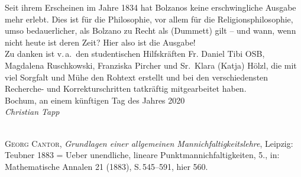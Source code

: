 \hbox{}\par\noindent{}%
\rule{0pt}{1.4\baselineskip}Seit ihrem Erscheinen im Jahre 1834 hat Bolzanos  keine erschwingliche Ausgabe mehr erlebt. Dies ist für die Philosophie, vor allem für die Religionsphilosophie, umso bedauerlicher, als Bolzano zu Recht als  (Dummett) gilt -- und wann, wenn nicht heute ist deren Zeit? Hier also ist die Ausgabe!\\[\baselineskip]
Zu danken ist v.\,a.\ den studentischen Hilfskräften Fr. Daniel Tibi OSB, Magdalena Ruschkowski, Franziska Pircher und Sr.~Klara (Katja) Hölzl, die mit viel Sorgfalt und Mühe den Rohtext erstellt und bei den verschiedensten Recherche- und Korrekturschritten tatkräftig mitgearbeitet haben.\\[\baselineskip]
Bochum, an einem künftigen Tag des Jahres 2020\\[\baselineskip]
\hbox{}\hfill\textit{Christian Tapp}

\RWch*{\hbox{}}\vspace{-0.35\baselineskip}
\\[0.5\baselineskip]
\textsc{Georg Cantor}, \textit{Grundlagen einer allgemeinen Mannichfaltigkeitslehre}, Leipzig: Teubner 1883 = Ueber unendliche, lineare Punktmannichfaltigkeiten, 5., in: Mathematische Annalen 21 (1883), S.\,545--591, hier 560.%

